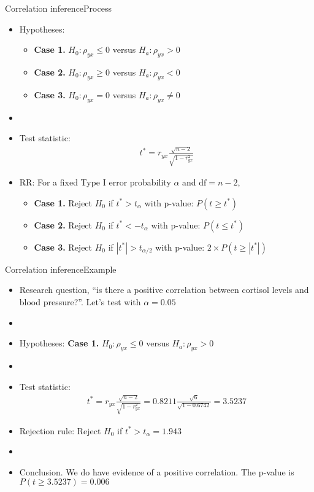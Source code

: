 \documentclass[xcolor=dvipsnames]{beamer}
\begin{document}
\begin{frame}{Correlation inference}{Process}
	\begin{itemize}
	\item Hypotheses: \pause
	\begin{itemize}
		\item \textbf{Case 1.} $H_0: \rho_{yx} \leq 0$ versus $H_a: \rho_{yx} > 0$ \pause
		\item \textbf{Case 2.} $H_0: \rho_{yx} \geq 0$ versus $H_a: \rho_{yx} < 0$ \pause
		\item \textbf{Case 3.} $H_0: \rho_{yx} = 0$ versus $H_a: \rho_{yx} \neq 0$ \pause
	\end{itemize}
	\item[]
	\item Test statistic:
	\begin{gather*}
	t^* = r_{yx} \frac{\sqrt{n-2}}{\sqrt{1-r^2_{yx}}}
	\end{gather*} \pause
	
	\item RR: For a fixed Type I error probability $\alpha$ and $\text{df}=n-2$, \pause
	\begin{itemize}
		\item \textbf{Case 1.} Reject $H_0$ if $t^* > t_{\alpha}$ with p-value: $P(t\geq t^*)$ \pause
		\item \textbf{Case 2.} Reject $H_0$ if $t^* < -t_{\alpha}$ with p-value: $P(t\leq t^*)$ \pause
		\item \textbf{Case 3.} Reject $H_0$ if $|t^*| > t_{\alpha / 2}$ with p-value: $2\times P(t\geq |t^*|)$
	\end{itemize}
	\end{itemize}
\end{frame}

\begin{frame}{Correlation inference}{Example}
	\begin{itemize}
		\item Research question, ``is there a positive correlation between cortisol levels and blood pressure?''. Let's test with $\alpha = 0.05$ \pause
		\item[]
		\item Hypotheses: \textbf{Case 1.} $H_0: \rho_{yx} \leq 0$ versus $H_a: \rho_{yx} > 0$\pause
		\item[]
		\item Test statistic: \pause
		\begin{gather*}
		t^* = r_{yx} \frac{\sqrt{n-2}}{\sqrt{1-r^2_{yx}}} = 0.8211 \frac{\sqrt{6}}{\sqrt{1-0.6742}} = 3.5237
		\end{gather*} \pause
		
		\item Rejection rule: Reject $H_0$ if $t^* > t_{\alpha} = 1.943$ \pause
		\item[]
		\item Conclusion. We do have evidence of a positive correlation. The p-value is $P(t\geq 3.5237)=0.006$
	\end{itemize}
\end{frame}
\end{document}
